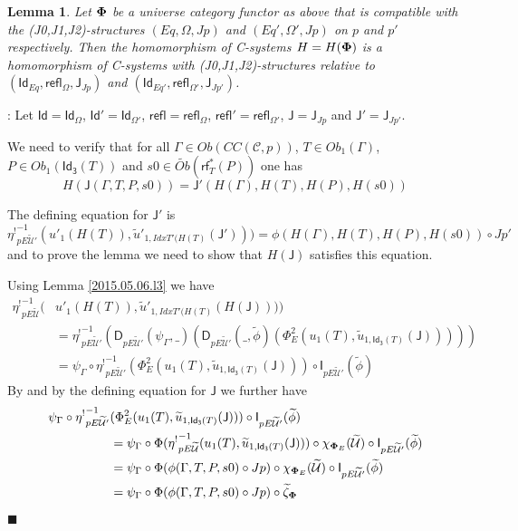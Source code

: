 \documentclass[12pt]{article}
\numberwithin{equation}{section}
\newenvironment{myproof}{{\bf Proof}:}{$\blacksquare$ \vskip 5mm }
\newtheorem{lemma}[proposition]{Lemma}
\newcommand{\wt}{\widetilde}
\newcommand{\toCC}{CC} %
\newcommand{\C}{{\mathcal C}}  %
\newcommand{\Id}{\mathsf{Id}} %
\newcommand{\Idx}{\mathsf{Id_3}} %
\newcommand{\refl}{\mathsf{refl}}
\newcommand{\J}{\mathsf{J}}
\newcommand{\U}{\mathcal{U}}
\newcommand{\D}{\mathsf{D}}
\newcommand{\I}{\mathsf{I}}
\newcommand{\rf}{\mathsf{rf}}
\newcommand{\etashriek}{\eta^!}
\newcommand{\etaunshriek}{{\etashriek}^{-1}}
\newcommand{\Obwt}{\wt{Ob}}
\begin{document}
\begin{lemma}
\label{2015.04.12.l3} Let ${\bf\Phi}$ be a universe category functor as above
that is compatible with the (J0,J1,J2)-structures $(Eq,\Omega,Jp)$ and
$(Eq',\Omega',Jp)$ on $p$ and $p'$ respectively. Then the homomorphism of
C-systems $H=H({\bf\Phi})$ is a homomorphism of C-systems with
(J0,J1,J2)-structures relative to $(\Id_{Eq},\refl_{\Omega},\J_{Jp})$ and
$(\Id_{Eq'},\refl_{\Omega'},\J_{Jp'})$.
\end{lemma}
%
\begin{myproof}
Let $\Id=\Id_{\Omega}$, $\Id'=\Id_{\Omega'}$, $\refl=\refl_{\Omega}$,
$\refl'=\refl_{\Omega'}$, $\J=\J_{Jp}$ and $\J'=\J_{Jp'}$.

We need to verify that for all $\Gamma\in Ob(\toCC({\C},p))$, $T\in
Ob_1(\Gamma)$, $P\in Ob_1(\Idx(T))$ and $s0\in \Obwt(\rf^*_T(P))$ one has
%
$$H(\J(\Gamma,T,P,s0))=\J'(H(\Gamma),H(T),H(P),H(s0))$$
%

The defining equation for $\J'$ is
%
$$\etaunshriek_{pE\wt{\U}'}(u'_1(H(T)),\wt{u}'_{1,{IdxT'(H(T)}}(\J')))=\phi(H(\Gamma),H(T),H(P),H(s0))\circ
Jp'$$
%
and to prove the lemma we need to show that $H(\J)$ satisfies this equation.

Using Lemma \ref{2015.05.06.l3} we have
%
\begin{align*}
  \etaunshriek_{pE\wt{\U}}(&u'_1(H(T)),\wt{u}'_{1,{IdxT'(H(T)}}(H(\J)))) \\
    & = \etaunshriek_{pE\wt{\U}'}(\D_{pE\wt{\U}'}(\psi_{\Gamma},\_)(\D_{pE\wt{\U}'}(\_,\wt{\phi})(\Phi_E^2(u_1(T),\wt{u}_{1,\Idx(T)}(\J))))) \\
    & = \psi_{\Gamma}\circ \etaunshriek_{pE\wt{\U}'}(\Phi_E^2(u_1(T),\wt{u}_{1,\Idx(T)}(\J)))\circ \I_{pE\wt{\U}'}(\wt{\phi})
\end{align*}
%
By \cite[Lemma 5.8]{fromunivwithPi} and by the defining equation for $\J$ we
further have
%
\begin{align*}
  \psi_{\Gamma}\circ \etaunshriek_{pE\wt{\U}'}&(\Phi_E^2(u_1(T),\wt{u}_{1,\Idx(T)}(\J)))\circ \I_{pE\wt{\U}'}(\wt{\phi}) \\
    & = \psi_{\Gamma}\circ \Phi(\etaunshriek_{pE\wt{\U}}(u_1(T),\wt{u}_{1,\Idx(T)}(\J)))\circ \chi_{{\bf\Phi}_E}(\wt{\U})\circ \I_{pE\wt{\U}'}(\wt{\phi}) \\
    & = \psi_{\Gamma}\circ \Phi(\phi(\Gamma,T,P,s0)\circ Jp)\circ \chi_{{\bf\Phi}_E}(\wt{\U})\circ \I_{pE\wt{\U}'}(\wt{\phi}) \\
    & = \psi_{\Gamma}\circ \Phi(\phi(\Gamma,T,P,s0)\circ Jp)\circ \wt{\zeta}_{\bf\Phi}
\end{align*}
%


\end{myproof}
\end{document}
